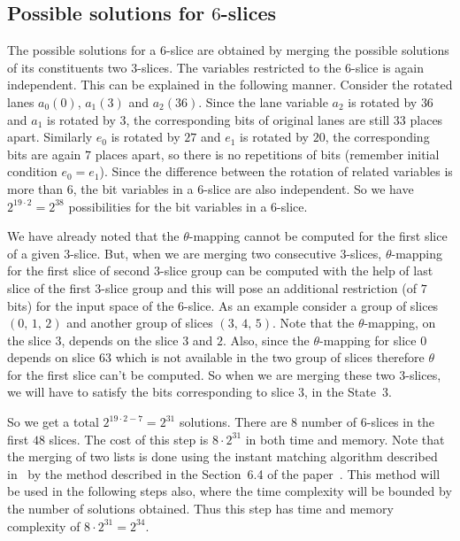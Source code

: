 \subsection{Possible solutions for  $6$-slices}
The possible solutions for a $6$-slice are obtained by merging the possible solutions of its constituents two $3$-slices. The variables restricted to the $6$-slice is again independent. This can be explained in the following manner. Consider the rotated lanes $a_0(0)$, $a_1(3)$ and $a_2(36)$. Since the lane variable $a_2$ is rotated by $36$ and $a_1$ is rotated by $3$, the corresponding bits of original lanes are still $33$ places apart. Similarly $e_0$ is rotated by $27$ and $e_1$ is rotated by $20$, the corresponding bits are again $7$ places apart, so there is no repetitions of bits (remember initial condition $e_0 = e_1$). Since the difference between the rotation of related variables is more than $6$, the bit variables in a $6$-slice are also independent.
So we have $2^{19\cdot 2}= 2^{38}$ possibilities for the bit variables in a $6$-slice. 

We have already noted that the $\theta$-mapping cannot be computed for the first slice of a given $3$-slice. But, when we are merging two consecutive $3$-slices, $\theta$-mapping for the first slice of second $3$-slice group can be computed with the help of last slice of the first $3$-slice group and this will pose an additional restriction (of $7$ bits) for the input space of the $6$-slice.
As an example consider a group of slices $(0,\,1,\,2)$ and another group of slices $(3,\,4,\,5)$. Note that the $\theta$-mapping, on the slice $3$, depends on the slice $3$ and $2$. Also, since the $\theta$-mapping for slice $0$ depends on slice $63$ which is not available in the two group of slices therefore $\theta$ for the first slice can't be computed. So when we are merging these two $3$-slices, we will have to satisfy the bits corresponding to slice $3$, in the State~3. 

So we get a total $2^{19\cdot 2 - 7} = 2^{31}$ solutions. There are $8$ number of $6$-slices in the first $48$ slices.
The cost of this step is $8 \cdot 2^{31}$ in both time and memory. Note that the merging of two lists is done using the instant matching
algorithm described in~\cite{naya2011improve} by the method described in the Section~6.4 of the paper~\cite{naya2011practical}. This method will be used in the following steps also, where the time complexity will be bounded by the number of solutions obtained. Thus this step has time and memory complexity of $8 \cdot 2^{31} = 2^{34}$.


